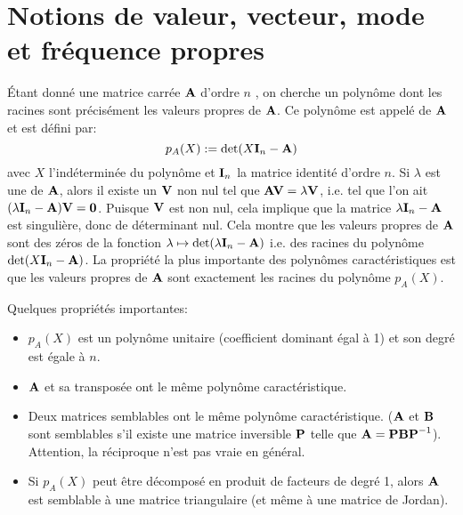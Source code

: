 \medskip
\section{Notions de valeur, vecteur, mode et fréquence propres}

\medskip
Étant donné une matrice carrée $\MM{A}$ d'ordre $n$ ,
on cherche un polynôme dont les racines sont précisément les valeurs propres de $\MM{A}$.
Ce polynôme est appelé 
de $\MM{A}$ et est défini par:
\begin{equation} p_A(X):=\det(X\MM{I}_n-\MM{A})\end{equation}
avec $X$ l'indéterminée du polynôme et $\MM{I}_n$ la matrice identité d'ordre $n$.
\medskipvm
Si $\lambda$ est une  de $\MM{A}$, alors il existe un
 $\VV{V}$ non nul tel que $\MM{A}\VV{V} = \lambda \VV{V}$, i.e.
tel que l'on ait $(\lambda \MM{I}_n-\MM{A})\VV{V} = \VV{0}$.
\medskipvm
Puisque $\VV{V}$ est non nul, cela implique que la matrice $\lambda \MM{I}_n-\MM{A}$ est singulière, donc de déterminant nul.
\medskipvm
Cela montre que les valeurs propres de $\MM{A}$ sont des zéros de la fonction $\lambda\mapsto \det(\lambda \MM{I}_n - \MM{A})$
i.e. des racines du polynôme $\det(X\MM{I}_n-\MM{A})$.
\medskipvm
La propriété la plus importante des polynômes caractéristiques est que
les valeurs propres de $\MM{A}$ sont exactement les racines du polynôme $p_A(X)$.

\medskip
Quelques propriétés importantes:
\begin{itemize}
   \item $p_A(X)$ est un polynôme unitaire (coefficient dominant égal à 1) et son degré
	est égale à $n$.
   \item $\MM{A}$ et sa transposée ont le même polynôme caractéristique.
   \item Deux matrices semblables ont le même polynôme caractéristique. ($\MM{A}$ et $\MM{B}$ sont semblables s'il
	existe une matrice inversible $\MM{P}$ telle que $\MM{A} = \MM{PBP}^{-1}$).
	Attention, la réciproque n'est pas vraie en général.
   \item Si $p_A(X)$ peut être décomposé en produit de facteurs de degré 1, alors $\MM{A}$ est semblable
	à une matrice triangulaire (et même à une matrice de Jordan).
\end{itemize}

